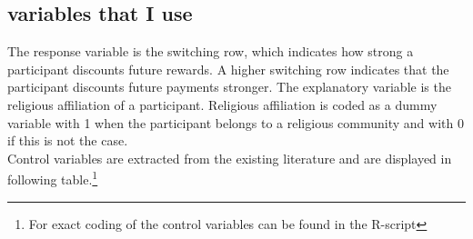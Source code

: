 \documentclass[12pt,a4paper]{article}
\begin{document}

\subsection{variables that I use}
The response variable is the switching row, which indicates how strong a participant discounts future rewards. A higher switching row indicates that the participant discounts future payments stronger. 
The explanatory variable is the religious affiliation of a participant. Religious affiliation is coded as a dummy variable with 1 when the participant belongs to a religious community and with 0 if this is not the case.\\

Control variables are extracted from the existing literature and are displayed in following table.\footnote{For exact coding of the control variables can be found in the R-script}


\begin{table}[!htbp] 
\centering 
  \caption{Control variables}
\begin{center}
\end{center}
\end{table}

\end{document}
